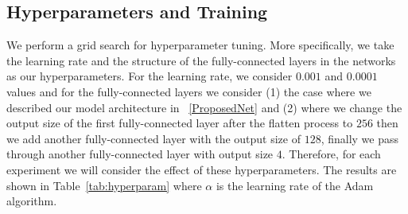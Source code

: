 \documentclass{article} %
\begin{document}
\subsection{Hyperparameters and Training}
We perform a grid search for hyperparameter tuning. More specifically, we take the learning rate and the structure of the fully-connected layers in the networks as our hyperparameters. For the learning rate, we consider $0.001$ and $0.0001$ values and for the fully-connected layers we consider (1) the case where we described our model architecture in ~\ref{ProposedNet} and (2) where we change the output size of the first fully-connected layer after the flatten process to $256$ then we add another fully-connected layer with the output size of $128$, finally we pass through another fully-connected layer with output size $4$. Therefore, for each experiment we will consider the effect of these hyperparameters.
The results are shown in Table~\ref{tab:hyperparam} where $\alpha$ is the learning rate of the Adam algorithm.
\end{document}
